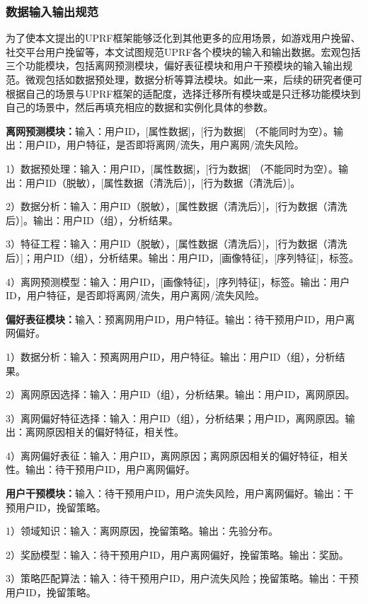 \subsubsection{数据输入输出规范}
为了使本文提出的UPRF框架能够泛化到其他更多的应用场景，如游戏用户挽留、社交平台用户挽留等，本文试图规范UPRF各个模块的输入和输出数据。宏观包括三个功能模块，包括离网预测模块，偏好表征模块和用户干预模块的输入输出规范。微观包括如数据预处理，数据分析等算法模块。如此一来，后续的研究者便可根据自己的场景与UPRF框架的适配度，选择迁移所有模块或是只迁移功能模块到自己的场景中，然后再填充相应的数据和实例化具体的参数。
\par
\textbf{离网预测模块：}输入：用户ID，[属性数据]，[行为数据] （不能同时为空）。输出：用户ID，用户特征，是否即将离网/流失，用户离网/流失风险。
\par
1）数据预处理：输入：用户ID，[属性数据]，[行为数据] （不能同时为空）。输出：用户ID（脱敏），[属性数据（清洗后）]，[行为数据（清洗后）]。
\par
2）数据分析：输入：用户ID（脱敏），[属性数据（清洗后）]，[行为数据（清洗后）]。输出：用户ID（组），分析结果。
\par
3）特征工程：输入：用户ID（脱敏），[属性数据（清洗后）]，[行为数据（清洗后）]；用户ID（组），分析结果。输出：用户ID，[画像特征]，[序列特征]，标签。
\par
4）离网预测模型：输入：用户ID，[画像特征]，[序列特征]，标签。输出：用户ID，用户特征，是否即将离网/流失，用户离网/流失风险。
\par

\textbf{偏好表征模块：}输入：预离网用户ID，用户特征。输出：待干预用户ID，用户离网偏好。
\par
1）数据分析：输入：预离网用户ID，用户特征。输出：用户ID（组），分析结果。
\par
2）离网原因选择：输入：用户ID（组），分析结果。输出：用户ID，离网原因。
\par
3）离网偏好特征选择：输入：用户ID（组），分析结果；用户ID，离网原因。输出：离网原因相关的偏好特征，相关性。
\par
4）离网偏好表征：输入：用户ID，离网原因；离网原因相关的偏好特征，相关性。输出：待干预用户ID，用户离网偏好。
\par

\textbf{用户干预模块：}输入：待干预用户ID，用户流失风险，用户离网偏好。输出：干预用户ID，挽留策略。
\par
1）领域知识：输入：离网原因，挽留策略。输出：先验分布。
\par
2）奖励模型：输入：待干预用户ID，用户离网偏好，挽留策略。输出：奖励。
\par
3）策略匹配算法：输入：待干预用户ID，用户流失风险；挽留策略。输出：干预用户ID，挽留策略。
\par

